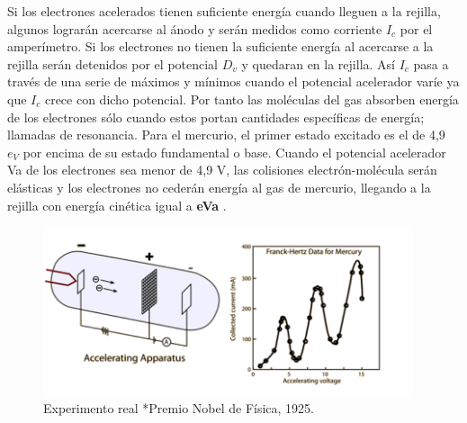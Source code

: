 \documentclass{article}									%
\begin{document}
Si los electrones acelerados tienen suficiente energía cuando lleguen a la rejilla, algunos lograrán acercarse al ánodo y serán medidos como corriente $I_{c}$ por el amperímetro. Si los electrones no tienen la suficiente energía al acercarse a la rejilla serán detenidos por el potencial $D_{v}$ y quedaran en la rejilla. Así $I_{c}$ pasa a través de una serie de máximos y mínimos cuando el potencial acelerador varíe ya que $I_{c}$  crece con dicho potencial. Por tanto las moléculas del gas absorben energía de los electrones sólo cuando estos portan cantidades específicas de energía; llamadas de resonancia. Para el mercurio, el primer estado excitado es el de 4,9 $e_{V}$ por encima de su estado fundamental o base. Cuando el potencial acelerador Va de los electrones sea menor de 4,9 V, las colisiones electrón-molécula serán elásticas y los electrones no cederán energía al gas de mercurio, llegando a la rejilla con energía cinética igual a \textbf{eVa} .
\begin{figure}[H]
  \centering
     \includegraphics[width=0.97\textwidth]{grafica}
     \caption{Experimento real *Premio Nobel de Física, 1925.}
      \label{fig:grafica}
\end{figure}
\end{document}
